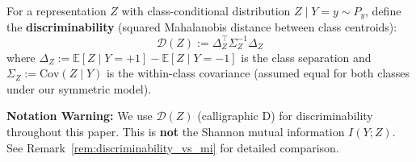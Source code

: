 \begin{definition}
\label{def:discriminability}
For a representation $Z$ with class-conditional distribution $Z \mid Y = y \sim P_y$, define the \textbf{discriminability} (squared Mahalanobis distance between class centroids):
\begin{equation}
    \mathcal{D}(Z) := \Delta_Z^\top \Sigma_Z^{-1} \Delta_Z
\end{equation}
where $\Delta_Z := \mathbb{E}[Z \mid Y=+1] - \mathbb{E}[Z \mid Y=-1]$ is the class separation and $\Sigma_Z := \mathrm{Cov}(Z \mid Y)$ is the within-class covariance (assumed equal for both classes under our symmetric model).

\textbf{Notation Warning:} We use $\mathcal{D}(Z)$ (calligraphic D) for discriminability throughout this paper. This is \textbf{not} the Shannon mutual information $I(Y; Z)$. See Remark~\ref{rem:discriminability_vs_mi} for detailed comparison.
\end{definition}

